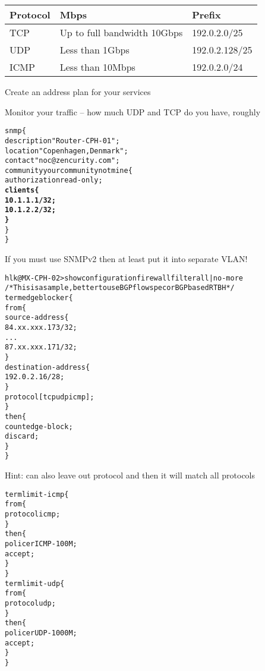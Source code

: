 \documentclass[Screen16to9,17pt]{foils}
\begin{document}
\begin{tabularx}{\textwidth-5cm}{|p{3cm}|p{7cm}|X|} \hline
{\bf Protocol} & {\bf Mbps} & {\bf Prefix}\\\hline
TCP & Up to full bandwidth 10Gbps & 192.0.2.0/25 \\\hline
UDP & Less than 1Gbps & 192.0.2.128/25 \\\hline
ICMP & Less than 10Mbps & 192.0.2.0/24 \\\hline
\end{tabularx}

\begin{list2}
\item Create an address plan for your services
\item Monitor your traffic -- how much UDP and TCP do you have, roughly
\end{list2}




\begin{alltt}\footnotesize
snmp \{
    description "Router-CPH-01";
    location "Copenhagen, Denmark";
    contact "noc@zencurity.com";
    community yourcommunitynotmine \{
        authorization read-only;
        {\bf clients \{
               10.1.1.1/32;
               10.1.2.2/32;
        \}    }
    \}
\}
\end{alltt}

If you must use SNMPv2 then at least put it into separate VLAN! {\myalert}




\begin{alltt}\footnotesize
hlk@MX-CPH-02> show configuration firewall filter all | no-more
/* This is a sample, better to use BGP flowspec or BGP based RTBH */
term edgeblocker \{
    from \{
        source-address \{
            84.xx.xxx.173/32;
...
            87.xx.xxx.171/32;
        \}
        destination-address \{
            192.0.2.16/28;
        \}
        protocol [ tcp udp icmp ];
    \}
    then \{
        count edge-block;
        discard;
    \}
\}
\end{alltt}
Hint: can also leave out protocol and then it will match all protocols


\begin{alltt}\footnotesize
term limit-icmp \{
    from \{
        protocol icmp;
    \}
    then \{
        policer ICMP-100M;
        accept;
    \}
\}
term limit-udp \{
    from \{
        protocol udp;
    \}
    then \{
        policer UDP-1000M;
        accept;
    \}
\}
\end{alltt}
\end{document}
